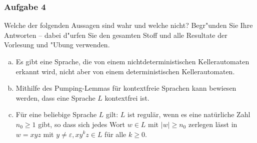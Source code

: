 \documentclass{beamer}
\begin{document}
	\begin{frame} \frametitle{Aufgabe 4}
		\small
		Welche der folgenden Aussagen sind wahr und welche nicht? Begr"unden Sie Ihre
		Antworten -- dabei d"urfen Sie den gesamten Stoff und alle Resultate
		der Vorlesung und "Ubung verwenden.
		\begin{enumerate}[(a)]
			\item Es gibt eine Sprache, die von einem nichtdeterministischen Kellerautomaten erkannt wird, nicht aber von einem deterministischen Kellerautomaten.
			\item Mithilfe des Pumping-Lemmas f\"ur kontextfreie Sprachen kann
			bewiesen werden, dass eine Sprache $L$ kontextfrei ist. 
			\item F\"ur eine beliebige Sprache $L$ gilt: $L$ ist regul\"ar, wenn es eine nat\"urliche Zahl $n_0\ge 1$ gibt, so dass sich jedes Wort $w\in L$ mit $|w|\ge n_0$ zerlegen l\"asst in $w=xyz$ mit $y\not = \varepsilon, xy^kz\in L$ f\"ur alle $k\ge 0$.
		\end{enumerate}
	\end{frame}

	
	
\end{document}
